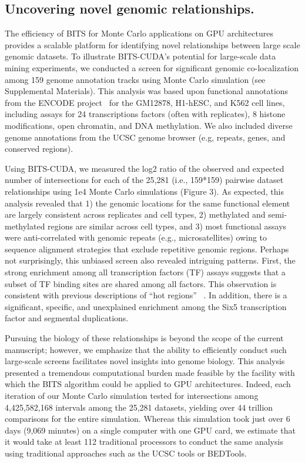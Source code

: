 \documentclass{bioinfo}
\begin{document}
\vspace{-2em}
\subsection{Uncovering novel genomic relationships.}
\label{hm:section}
The efficiency of BITS for Monte Carlo applications on GPU architectures
provides a scalable platform for identifying novel relationships between
large scale genomic datasets. To illustrate BITS-CUDA's potential
for large-scale data mining experiments, 
we conducted a screen for significant genomic co-localization among
159 genome annotation tracks using Monte Carlo simulation (see
Supplemental Materials). This analysis was based upon functional annotations 
from the ENCODE project~\citep{encode2007} for the GM12878, H1-hESC, and K562 
cell lines, including assays for 24 transcriptions factors 
(often with replicates), 8 histone
modifications, open chromatin, and DNA methylation. We also included diverse 
genome annotations from the UCSC genome browser (e.g, repeats, 
genes, and conserved regions).

Using BITS-CUDA, we measured the log2 ratio of the observed and expected number
of intersections for each of the 25,281 (i.e., 159*159) pairwise 
dataset relationships using 1e4 Monte Carlo simulations (Figure 3).
As expected, this analysis revealed that 1) the genomic locations 
for the same functional element are largely consistent across 
replicates and cell types, 2) methylated and semi-methylated regions
are similar across cell types, and 3) most functional assays were
anti-correlated with genomic repeats (e.g., microsatellites)
owing to sequence alignment strategies that exclude repetitive genomic
regions. Perhaps not surprisingly, this unbiased screen also revealed
intriguing patterns.  First, the strong enrichment among all
transcription factors (TF) assays suggests that a subset of TF
binding sites are shared among all factors. This observation is 
consistent with previous descriptions of ``hot regions''
~\citep{gerstein2010}. In addition, there is a significant, 
specific, and unexplained enrichment among the Six5 transcription factor
and segmental duplications. 

Pursuing the biology of these relationships is beyond the 
scope of the current manuscript; however, we emphasize that the ability 
to efficiently conduct such large-scale screens facilitates novel 
insights into genome biology. This analysis presented a tremendous
computational burden made feasible by the facility with which
the BITS algorithm could be applied to GPU architectures. Indeed, each
iteration of our Monte Carlo simulation tested for
intersections among 4,425,582,168 intervals among the 25,281 datasets,
yielding over 44 trillion comparisons for the entire simulation. Whereas
this simulation took just over 6 days (9,069 minutes) on a single
computer with one GPU card, we estimate that it would take at least 
112 traditional processors to conduct the same analysis using 
traditional approaches such as the UCSC tools or BEDTools.
\end{document}
